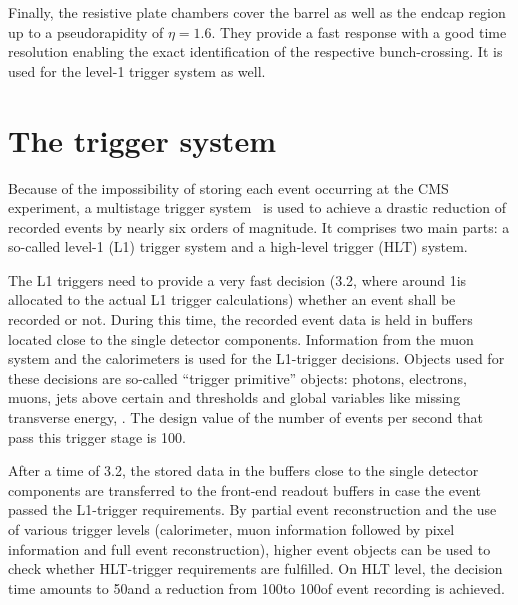 Finally, the resistive plate chambers cover the barrel as well as the endcap region up to a pseudorapidity of $\eta=1.6$. 
They provide a fast response with a good time resolution enabling the exact identification of the respective bunch-crossing.
It is used for the level-1 trigger system as well.
\section{The trigger system}
Because of the impossibility of storing each event occurring at the CMS experiment, a multistage trigger system~\cite{bib:CMS:TDR_2006} is used to achieve a drastic reduction of recorded events by nearly six orders of magnitude.
It comprises two main parts: a so-called level-1 (L1) trigger system and a high-level trigger (HLT) system.

The L1 triggers need to provide a very fast decision (3.2\mus, where around 1\mus is allocated to the actual L1 trigger calculations) whether an event shall be recorded or not.
During this time, the recorded event data is held in buffers located close to the single detector components.
Information from the muon system and the calorimeters is used for the L1-trigger decisions.
Objects used for these decisions are so-called ``trigger primitive'' objects: photons, electrons, muons, jets above certain \et and \pt thresholds and global variables like missing transverse energy, \met. 
The design value of the number of events per second that pass this trigger stage is 100\khz.

After a time of 3.2\mus, the stored data in the buffers close to the single detector components are transferred to the front-end readout buffers in case the event passed the L1-trigger requirements.
By partial event reconstruction and the use of various trigger levels (calorimeter, muon information followed by pixel information and full event reconstruction), higher event objects can be used to check whether HLT-trigger requirements are fulfilled.
On HLT level, the decision time amounts to 50\ms and a reduction from 100\khz to 100\hz of event recording is achieved.

\FloatBarrier
